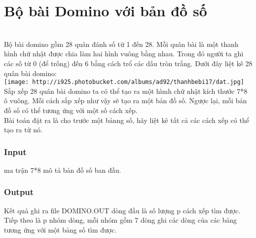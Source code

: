 



\section{\textbf{    Bộ bài Domino với bản đồ số   }}


\\   Bộ bài domino gồm 28 quân đánh số từ 1 đến 28. Mỗi quân bài là một thanh hình chữ nhật được chia làm hai hình vuông bằng nhau. Trong đó người ta ghi các số từ 0 (để trống) đến 6 bằng cách trổ các dấu tròn trắng. Dưới đây liệt kê 28 quân bài domino:   
\\
\texttt{[image: http://i925.photobucket.com/albums/ad92/thanhbebi17/dat.jpg]}
\\   Sắp xếp 28 quân bài domino ta có thể tạo ra một hìmh chữ nhật kích thước 7*8 ô vuông. Mỗi cách sắp xếp như vậy sẽ tạo ra một bản đồ số. Ngược lại, mỗi bản đồ số có thể tương ứng với một số cách xếp.   
\\   Bài toán đặt ra là cho trước một bảnng số, hãy liệt kê tất cả các cách xếp có thể tạo ra từ nó.  

\subsubsection{   Input  }

   ma trận 7*8 mô tả bản đồ số ban đầu.  

\subsubsection{   Output  }

   Kết quả ghi ra file DOMINO.OUT dòng đầu là số lượng p cách xếp tìm được. Tiếp theo là p nhóm dòng, mỗi nhóm gồm 7 dòng ghi các dòng của các bảng tương ứng với một bảng số tìm được.  

